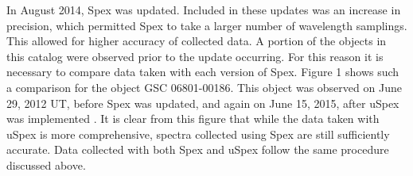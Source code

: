 In August 2014, Spex was updated.  Included in these updates was an increase in precision, which permitted Spex to take a larger number of  wavelength samplings.  This allowed for higher accuracy of collected data.  A portion of the objects in this catalog were observed prior to the update occurring.  For this reason it is necessary to compare data taken with each version of Spex. Figure 1 shows such a comparison for the object GSC 06801-00186.  This object was observed on June 29, 2012 UT, before Spex was updated, and again on June 15, 2015, after uSpex was implemented \cite{Spextool_Manual_Cushing_2015}.  It is clear from this figure that while the data taken with uSpex is more comprehensive, spectra collected using Spex are still sufficiently accurate.  Data collected with both Spex and uSpex follow the same procedure discussed above.\\

